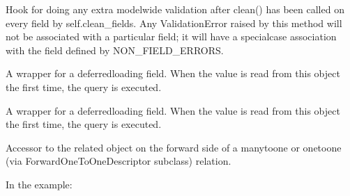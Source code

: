 \documentclass[letterpaper,10pt,spanish]{sphinxmanual}
\begin{document}
\begin{fulllineitems}
\begin{fulllineitems}
\end{fulllineitems}



\begin{fulllineitems}

\pysigstartsignatures
{}
\pysigstopsignatures
\sphinxAtStartPar
Hook for doing any extra model\sphinxhyphen{}wide validation after clean() has been
called on every field by self.clean\_fields. Any ValidationError raised
by this method will not be associated with a particular field; it will
have a special\sphinxhyphen{}case association with the field defined by NON\_FIELD\_ERRORS.

\end{fulllineitems}



\begin{fulllineitems}

\pysigstartsignatures
{}
\pysigstopsignatures
\sphinxAtStartPar
A wrapper for a deferred\sphinxhyphen{}loading field. When the value is read from this
object the first time, the query is executed.

\end{fulllineitems}



\begin{fulllineitems}

\pysigstartsignatures
{}
\pysigstopsignatures
\sphinxAtStartPar
A wrapper for a deferred\sphinxhyphen{}loading field. When the value is read from this
object the first time, the query is executed.

\end{fulllineitems}



\begin{fulllineitems}

\pysigstartsignatures
{}
\pysigstopsignatures
\sphinxAtStartPar
Accessor to the related object on the forward side of a many\sphinxhyphen{}to\sphinxhyphen{}one or
one\sphinxhyphen{}to\sphinxhyphen{}one (via ForwardOneToOneDescriptor subclass) relation.

\sphinxAtStartPar
In the example:

\begin{sphinxVerbatim}[commandchars=\\\{\}]
 
       
\end{sphinxVerbatim}


\end{fulllineitems}
\end{fulllineitems}
\end{document}
